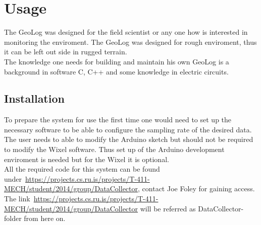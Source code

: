\section{Usage}
The GeoLog was designed for the field scientist or any one how is interested in monitoring the enviroment. The GeoLog was designed for rough enviroment, thus it can be left out side in rugged terrain.\\
The knowledge one needs for building and maintain his own GeoLog is a background in software C, C++ and some knowledge in electric circuits. %

\subsection{Installation}
To prepare the system for use the first time one would need to set up the necessary software to be able to configure the sampling rate of the desired data. The user needs to able to modify the Arduino sketch but should not be required to modify the Wixel software. Thus set up of the Arduino development enviroment is needed but for the Wixel it is optional.\\
All the required code for this system can be found under~\url{https://projects.cs.ru.is/projects/T-411-MECH/student/2014/group/DataCollector}, contact Joe Foley for gaining access. The link~\url{https://projects.cs.ru.is/projects/T-411-MECH/student/2014/group/DataCollector} will be referred as DataCollector-folder from here on.\\

